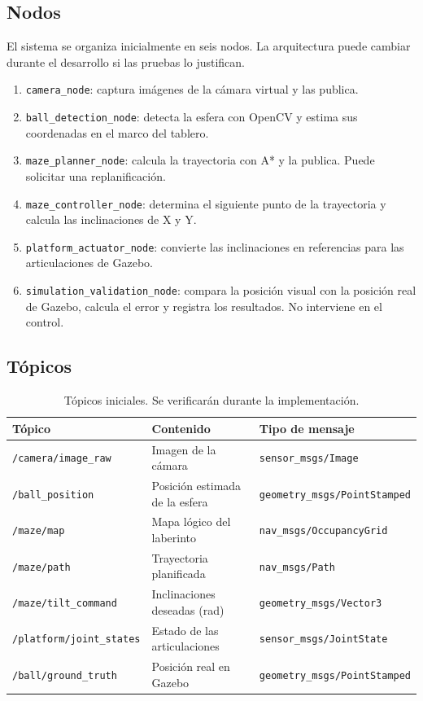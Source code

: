 \documentclass[11pt,a4paper]{article}
\begin{document}
\subsection{Nodos}
El sistema se organiza inicialmente en seis nodos. La arquitectura puede cambiar durante el desarrollo si las pruebas lo justifican.
\begin{enumerate}
    \item \texttt{camera\_node}: captura imágenes de la cámara virtual y las publica.
    \item \texttt{ball\_detection\_node}: detecta la esfera con OpenCV y estima sus coordenadas en el marco del tablero.
    \item \texttt{maze\_planner\_node}: calcula la trayectoria con A* y la publica. Puede solicitar una replanificación.
    \item \texttt{maze\_controller\_node}: determina el siguiente punto de la trayectoria y calcula las inclinaciones de X y Y.
    \item \texttt{platform\_actuator\_node}: convierte las inclinaciones en referencias para las articulaciones de Gazebo.
    \item \texttt{simulation\_validation\_node}: compara la posición visual con la posición real de Gazebo, calcula el error y registra los resultados. No interviene en el control.
\end{enumerate}

\subsection{Tópicos}
\begin{table}[H]
    \centering
    \begin{tabular}{@{}lll@{}}
        \toprule
        \textbf{Tópico} & \textbf{Contenido} & \textbf{Tipo de mensaje} \\
        \midrule
        \texttt{/camera/image\_raw} & Imagen de la cámara & \texttt{sensor\_msgs/Image} \\
        \texttt{/ball\_position} & Posición estimada de la esfera & \texttt{geometry\_msgs/PointStamped} \\
        \texttt{/maze/map} & Mapa lógico del laberinto & \texttt{nav\_msgs/OccupancyGrid} \\
        \texttt{/maze/path} & Trayectoria planificada & \texttt{nav\_msgs/Path} \\
        \texttt{/maze/tilt\_command} & Inclinaciones deseadas (rad) & \texttt{geometry\_msgs/Vector3} \\
        \texttt{/platform/joint\_states} & Estado de las articulaciones & \texttt{sensor\_msgs/JointState} \\
        \texttt{/ball/ground\_truth} & Posición real en Gazebo & \texttt{geometry\_msgs/PointStamped} \\
        \bottomrule
    \end{tabular}
    \caption{Tópicos iniciales. Se verificarán durante la implementación.}
\end{table}
\end{document}

